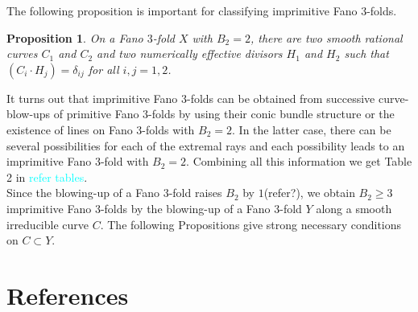 \documentclass[12pt]{amsart}
\theoremstyle{plain}
\newtheorem{proposition}[theorem]{Proposition}
\theoremstyle{definition}
\theoremstyle{expl}
\begin{document}
      \noindent The following proposition is important for classifying imprimitive Fano $3$-folds.
    \begin{proposition}
    	On a Fano $3$-fold $X$ with $B_2 =2$, there are two smooth rational curves $C_1$ and $C_2$ and two numerically effective divisors $H_1$ and $H_2$ such that $(C_i \cdot H_j)= \delta_{ij}$ for all $i,j=1,2$. 
    \end{proposition}
    \noindent  
    It turns out that imprimitive Fano $3$-folds can be obtained from successive curve-blow-ups of primitive Fano $3$-folds by using their conic bundle structure or the existence of lines on Fano $3$-folds with $B_2=2$. In the latter case, there can be several possibilities for each of the extremal rays and each possibility leads to an imprimitive Fano $3$-fold with $B_2=2$. Combining all this information we get Table 2 in \textcolor{cyan}{refer tables}.\\
    \noindent Since the blowing-up of a Fano $3$-fold raises $B_2$ by $1$(refer?), we obtain $B_2 \geq 3$ imprimitive Fano $3$-folds by the blowing-up of a Fano $3$-fold $Y$ along a smooth irreducible curve $C$. The following Propositions give strong necessary conditions on $C \subset Y$.
    
	\section{References}
\end{document}
